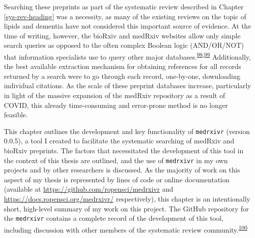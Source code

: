 \documentclass[a4paper, twoside]{templates/ociamthesis}
\begin{document}
Searching these preprints as part of the systematic review described in Chapter \ref{sys-rev-heading} was a necessity, as many of the existing reviews on the topic of lipids and dementia have not considered this important source of evidence. At the time of writing, however, the bioRxiv and medRxiv websites allow only simple search queries as opposed to the often complex Boolean logic (AND/OR/NOT) that information specialists use to query other major databases.\textsuperscript{\protect\hyperlink{ref-bramer2018a}{98},\protect\hyperlink{ref-gusenbauer2020}{99}} Additionally, the best available extraction mechanism for obtaining references for all records returned by a search were to go through each record, one-by-one, downloading individual citations. As the scale of these preprint databases increase, particularly in light of the massive expansion of the medRxiv repository as a result of COVID, this already time-consuming and error-prone method is no longer feasible.

This chapter outlines the development and key functionality of \texttt{medrxivr} (version 0.0.5), a tool I created to facilitate the systematic searching of medRxiv and bioRxiv preprints. The factors that necessitated the development of this tool in the context of this thesis are outlined, and the use of \texttt{medrxivr} in my own projects and by other researchers is discussed. As the majority of work on this aspect of my thesis is represented by lines of code or online documentation (available at \url{https://github.com/ropensci/medrxivr} and \url{https://docs.ropensci.org/medrxivr/} respectively), this chapter is an intentionally short, high-level summary of my work on this project. The GitHub repository for the \texttt{medrxivr} contains a complete record of the development of this tool, including discussion with other members of the systematic review community.\textsuperscript{\protect\hyperlink{ref-zotero-15029}{100}}

~
\end{document}
